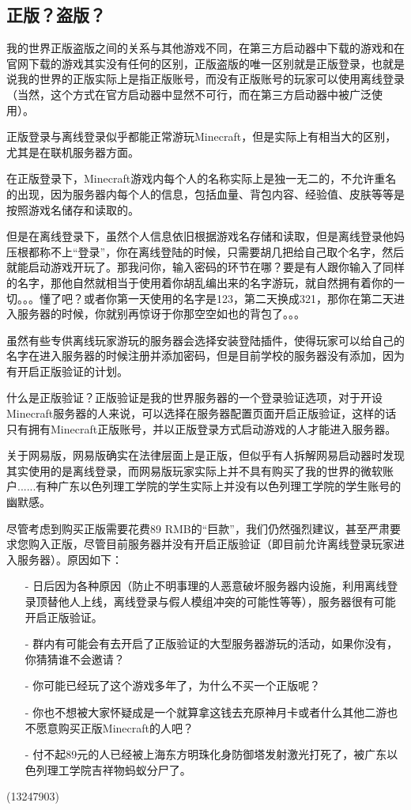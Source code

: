 \documentclass[UTF8,a4paper]{article}
\begin{document}
		\subsection{正版？盗版？}
			\hypertarget{1.4}{}
			\par 我的世界正版盗版之间的关系与其他游戏不同，在第三方启动器中下载的游戏和在官网下载的游戏其实没有任何的区别，正版盗版的唯一区别就是正版登录，也就是说我的世界的正版实际上是指正版账号，而没有正版账号的玩家可以使用离线登录（当然，这个方式在官方启动器中显然不可行，而在第三方启动器中被广泛使用）。
			\par 正版登录与离线登录似乎都能正常游玩Minecraft，但是实际上有相当大的区别，尤其是在联机服务器方面。
			\par 在正版登录下，Minecraft游戏内每个人的名称实际上是独一无二的，不允许重名的出现，因为服务器内每个人的信息，包括血量、背包内容、经验值、皮肤等等是按照游戏名储存和读取的。
			\par 但是在离线登录下，虽然个人信息依旧根据游戏名存储和读取，但是离线登录他妈压根都称不上“登录”，你在离线登陆的时候，只需要胡几把给自己取个名字，然后就能启动游戏开玩了。那我问你，输入密码的环节在哪？要是有人跟你输入了同样的名字，那他自然就相当于使用着你胡乱编出来的名字游玩，就自然拥有着你的一切。。。懂了吧？或者你第一天使用的名字是123，第二天换成321，那你在第二天进入服务器的时候，你就别再惊讶于你那空空如也的背包了。。。
			\par 虽然有些专供离线玩家游玩的服务器会选择安装登陆插件，使得玩家可以给自己的名字在进入服务器的时候注册并添加密码，但是目前学校的服务器没有添加，因为有开启正版验证的计划。
			\par 什么是正版验证？正版验证是我的世界服务器的一个登录验证选项，对于开设Minecraft服务器的人来说，可以选择在服务器配置页面开启正版验证，这样的话只有拥有Minecraft正版账号，并以正版登录方式启动游戏的人才能进入服务器。
			\par 关于网易版，网易版确实在法律层面上是正版，但似乎有人拆解网易启动器时发现其实使用的是离线登录，而网易版玩家实际上并不具有购买了我的世界的微软账户......有种广东以色列理工学院的学生实际上并没有以色列理工学院的学生账号的幽默感。
			\par 尽管考虑到购买正版需要花费89 RMB的“巨款”，我们仍然强烈建议，甚至严肃要求您购入正版，尽管目前服务器并没有开启正版验证（即目前允许离线登录玩家进入服务器）。原因如下：
			\begin{itemize}
				\item[-] 日后因为各种原因（防止不明事理的人恶意破坏服务器内设施，利用离线登录顶替他人上线，离线登录与假人模组冲突的可能性等等），服务器很有可能开启正版验证。
				\item[-] 群内有可能会有去开启了正版验证的大型服务器游玩的活动，如果你没有，你猜猜谁不会邀请？
				\item[-] 你可能已经玩了这个游戏多年了，为什么不买一个正版呢？
				\item[-] 你也不想被大家怀疑成是一个就算拿这钱去充原神月卡或者什么其他二游也不愿意购买正版Minecraft的人吧？
				\item[-] 付不起89元的人已经被上海东方明珠化身防御塔发射激光打死了，被广东以色列理工学院吉祥物蚂蚁分尸了。
			\end{itemize}
			\begin{flushright}(13247903)\end{flushright}
\end{document}

